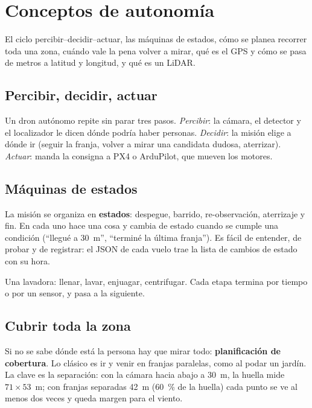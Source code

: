 \chapter{Conceptos de autonomía}

\begin{enpocas}
El ciclo percibir--decidir--actuar, las máquinas de estados, cómo se planea recorrer toda una zona,
cuándo vale la pena volver a mirar, qué es el GPS y cómo se pasa de metros a latitud y longitud, y qué
es un LiDAR.
\end{enpocas}

\section{Percibir, decidir, actuar}

Un dron autónomo repite sin parar tres pasos. \emph{Percibir}: la cámara, el detector y el localizador
le dicen dónde podría haber personas. \emph{Decidir}: la misión elige a dónde ir (seguir la franja,
volver a mirar una candidata dudosa, aterrizar). \emph{Actuar}: manda la consigna a PX4 o ArduPilot, que
mueven los motores.

\section{Máquinas de estados}

La misión se organiza en \textbf{estados}: despegue, barrido, re-observación, aterrizaje y fin. En cada
uno hace una cosa y cambia de estado cuando se cumple una condición (``llegué a 30~m'', ``terminé la
última franja''). Es fácil de entender, de probar y de registrar: el JSON de cada vuelo trae la lista de
cambios de estado con su hora.

\begin{ejemplo}
Una lavadora: llenar, lavar, enjuagar, centrifugar. Cada etapa termina por tiempo o por un sensor, y
pasa a la siguiente.
\end{ejemplo}

\section{Cubrir toda la zona}

Si no se sabe dónde está la persona hay que mirar todo: \textbf{planificación de cobertura}. Lo clásico
es ir y venir en franjas paralelas, como al podar un jardín. La clave es la separación: con la cámara
hacia abajo a 30~m, la huella mide $71\times53$~m; con franjas separadas 42~m (60~\% de la huella) cada
punto se ve al menos dos veces y queda margen para el viento.

